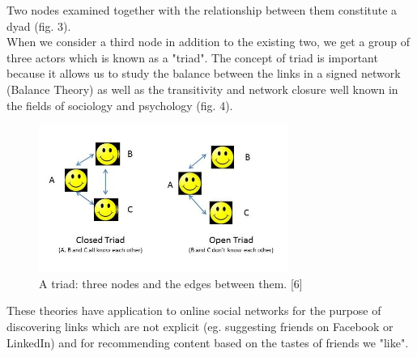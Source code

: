 \documentclass[conference,letterpaper]{IEEEtran}
\begin{document}
Two nodes examined together with the relationship between them constitute a dyad (fig. 3). \\
When we consider a third node in addition to the existing two, we get a group of three actors which is known 
as a "triad". The concept of triad is important because it allows us to study the balance between the links in a
signed network (Balance Theory) as well as the transitivity and network closure well known in the fields of
sociology and psychology (fig. 4).\\
\begin{center}
\begin{figure}[hb]
\centering
\includegraphics[width=3.2in]{open-triad}
\caption{
A triad: three nodes and the edges between them. [6]
}
\label{fig_sim}
\end{figure}
\end{center}
These theories have application to online social networks for the purpose of discovering links which are not
explicit (eg. suggesting friends on Facebook or LinkedIn) and for recommending content based on the tastes of friends we "like".\\
\end{document}
